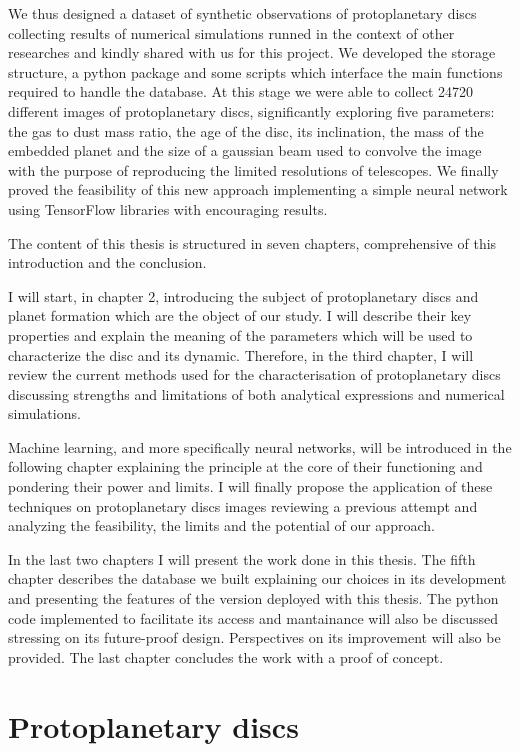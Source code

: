 \documentclass[a4paper,10pt]{report}
\begin{document}
We thus designed a dataset of synthetic observations of protoplanetary discs collecting
results of numerical simulations runned in the context of other researches and kindly shared with us
for this project. We developed the storage structure, a python package and some scripts which interface 
the main functions required to handle the database. At this stage we were able to collect 24720 different images 
of protoplanetary discs, significantly exploring five parameters: the gas to dust mass ratio, the age of the disc, its inclination, the mass of
the embedded planet and the size of a 
gaussian beam used to convolve the image with the purpose of reproducing the limited resolutions
of telescopes.
We finally proved the feasibility of this new approach implementing 
a simple neural network using TensorFlow libraries with encouraging results.

The content of this thesis is structured in seven chapters, comprehensive of this introduction and
the conclusion.

I will start, in chapter 2, introducing the subject of protoplanetary discs and planet formation which 
are the object of our study. I will describe their key properties and explain the meaning of the parameters 
which will be used to characterize the disc and its dynamic. Therefore, in the third chapter, I will review the current 
methods used for the characterisation of protoplanetary discs discussing strengths and limitations
of both analytical expressions and numerical simulations.

Machine learning, and more specifically neural networks, will 
be introduced in the following chapter explaining the principle at the core of their functioning and pondering 
their power and limits. I will finally propose the application of these techniques on protoplanetary discs images
reviewing a previous attempt \cite[S. Auddy and M. Lin]{Auddy_2020} and analyzing the feasibility, the limits and the potential of our approach.

In the last two chapters I will present the work done in this thesis. The fifth chapter describes the database we built
explaining our choices in its development and presenting the features of the version deployed with this thesis.
The python code implemented to facilitate its access and mantainance will also be discussed stressing on its future-proof design.
Perspectives on its improvement will also be provided.
The last chapter concludes the work with a proof of concept.

\chapter{Protoplanetary discs}
\end{document}
